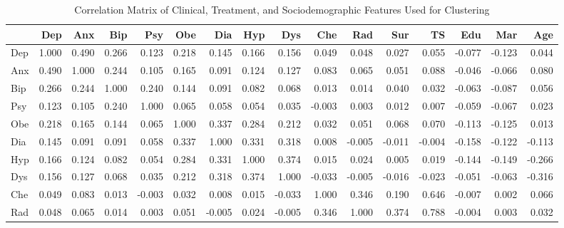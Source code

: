 \documentclass[11pt]{article}
\begin{document}
\begin{table}[H]
\centering
\caption{Correlation Matrix of Clinical, Treatment, and Sociodemographic Features Used for Clustering}
\label{tab:correlation_matrix}
\scriptsize

\begin{adjustbox}{max width=\textwidth}
\begin{tabular}{lrrrrrrrrrrrrrrr}
\toprule
&
Dep &
Anx &
Bip &
Psy &
Obe &
Dia &
Hyp &
Dys &
Che &
Rad &
Sur &
TS &
Edu &
Mar &
Age \\
\midrule

Dep &
1.000 & 0.490 & 0.266 & 0.123 & 0.218 & 0.145 &
0.166 & 0.156 & 0.049 & 0.048 & 0.027 & 0.055 &
-0.077 & -0.123 & 0.044 \\

Anx &
0.490 & 1.000 & 0.244 & 0.105 & 0.165 & 0.091 &
0.124 & 0.127 & 0.083 & 0.065 & 0.051 & 0.088 &
-0.046 & -0.066 & 0.080 \\

Bip &
0.266 & 0.244 & 1.000 & 0.240 & 0.144 & 0.091 &
0.082 & 0.068 & 0.013 & 0.014 & 0.040 & 0.032 &
-0.063 & -0.087 & 0.056 \\

Psy &
0.123 & 0.105 & 0.240 & 1.000 & 0.065 & 0.058 &
0.054 & 0.035 & -0.003 & 0.003 & 0.012 & 0.007 &
-0.059 & -0.067 & 0.023 \\

Obe &
0.218 & 0.165 & 0.144 & 0.065 & 1.000 & 0.337 &
0.284 & 0.212 & 0.032 & 0.051 & 0.068 & 0.070 &
-0.113 & -0.125 & 0.013 \\

Dia &
0.145 & 0.091 & 0.091 & 0.058 & 0.337 & 1.000 &
0.331 & 0.318 & 0.008 & -0.005 & -0.011 & -0.004 &
-0.158 & -0.122 & -0.113 \\

Hyp &
0.166 & 0.124 & 0.082 & 0.054 & 0.284 & 0.331 &
1.000 & 0.374 & 0.015 & 0.024 & 0.005 & 0.019 &
-0.144 & -0.149 & -0.266 \\

Dys &
0.156 & 0.127 & 0.068 & 0.035 & 0.212 & 0.318 &
0.374 & 1.000 & -0.033 & -0.005 & -0.016 & -0.023 &
-0.051 & -0.063 & -0.316 \\

Che &
0.049 & 0.083 & 0.013 & -0.003 & 0.032 & 0.008 &
0.015 & -0.033 & 1.000 & 0.346 & 0.190 & 0.646 &
-0.007 & 0.002 & 0.066 \\

Rad &
0.048 & 0.065 & 0.014 & 0.003 & 0.051 & -0.005 &
0.024 & -0.005 & 0.346 & 1.000 & 0.374 & 0.788 &
-0.004 & 0.003 & 0.032 \\


\end{tabular}
\end{adjustbox}
\end{table}
\end{document}
